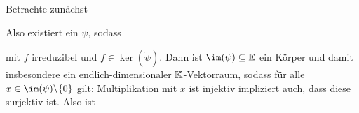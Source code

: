 \begin{beweis}
Betrachte zunächst
\begin{center}
\end{center}
Also existiert ein $\psi$, sodass
\begin{center}
\end{center}
mit $f$ irreduzibel und $f \in \ker(\tilde{\psi})$. Dann ist $\im(\psi)\sub \E$ ein Körper und damit insbesondere ein endlich-dimensionaler $\mathbb{K}$-Vektorraum, sodass für alle $x \in \im(\psi) \exc \{0\}$ gilt: Multiplikation mit $x$ ist injektiv impliziert auch, dass diese surjektiv ist. Also ist
\end{beweis}